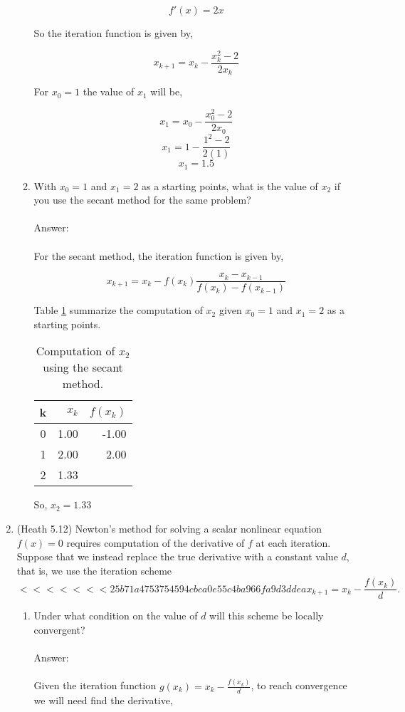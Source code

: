 \documentclass{article}
\begin{document}
\begin{enumerate}
\begin{enumerate}
$$f'(x)=2x$$

So the iteration function is given by,

$$x_{k+1}=x_k-\frac{x_k^2-2}{2x_k}$$

For $x_0=1$ the value of $x_1$ will be,

$$x_{1}=x_0-\frac{x_0^2-2}{2x_0}$$
$$x_{1}=1-\frac{1^2-2}{2(1)}$$
$$x_{1}=1.5$$
\item With $x_0 = 1$ and $x_1 = 2$ as a starting points, what is the value of $x_2$ if you use the secant method for the same problem?
\\
\\
Answer:\\
\\
For the secant method, the iteration function is given by,

$$x_{k+1}=x_k-f(x_k)\frac{x_k-x_{k-1}}{f(x_k)-f(x_{k-1})}$$

Table \ref{tab:q7a} summarize the computation of $x_2$ given $x_0 = 1$ and $x_1 = 2$ as a starting points.

\begin{table}[h]
 \centering
 \begin{center}
\begin{tabular}{crr}
\toprule
k & $x_k$ & $f(x_k)$\\
\midrule
0 & 1.00 & -1.00\\
1 & 2.00 &  2.00\\
2 & 1.33 & \\
\bottomrule
 \end{tabular}
 \end{center}
 \caption{Computation of $x_2$ using the secant method.}
 \label{tab:q7a}
\end{table}

So, $x_2=1.33$
 
\end{enumerate}

\item (Heath 5.12) Newton's method for solving a scalar nonlinear equation $f(x) = 0$ requires computation of the derivative of $f$ at each iteration.  Suppose that we instead replace
  the true derivative with a constant value $d$, that is, we use the iteration scheme
$$
<<<<<<< 25b71a4753754594cbca0e55c4ba966fa9d3ddea
x_{k+1} = x_k - \frac{f(x_k)}{d}.
$$
\begin{enumerate}
\item Under what condition on the value of $d$ will this scheme be locally convergent?
\\
\\
Answer:\\
\\
Given the iteration function $g(x_k)=x_k-\frac{f(x_k)}{d}$, to reach convergence we will need find the derivative,


\end{enumerate}
\end{enumerate}
\end{document}
